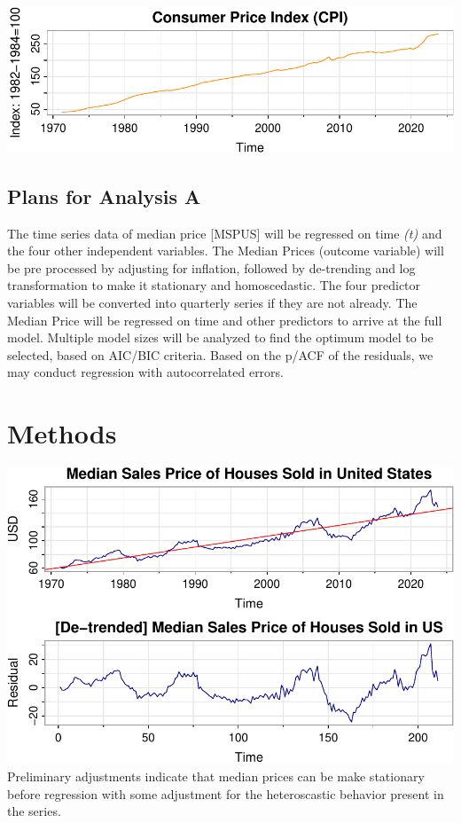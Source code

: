 \documentclass[
  man]{apa6}
\begin{document}
\includegraphics{STAT429Report_files/figure-latex/unnamed-chunk-7-1.pdf}

\subsection{Plans for Analysis A}\label{plans-for-analysis-a}

The time series data of median price {[}MSPUS{]} will be regressed on time \emph{(t)} and the four other independent variables. The Median Prices (outcome variable) will be pre processed by adjusting for inflation, followed by de-trending and log transformation to make it stationary and homoscedastic. The four predictor variables will be converted into quarterly series if they are not already. The Median Price will be regressed on time and other predictors to arrive at the full model. Multiple model sizes will be analyzed to find the optimum model to be selected, based on AIC/BIC criteria. Based on the p/ACF of the residuals, we may conduct regression with autocorrelated errors.

\section{Methods}\label{methods}

\includegraphics{STAT429Report_files/figure-latex/unnamed-chunk-8-1.pdf}
Preliminary adjustments indicate that median prices can be make stationary before regression with some adjustment for the heteroscastic behavior present in the series.
\end{document}
